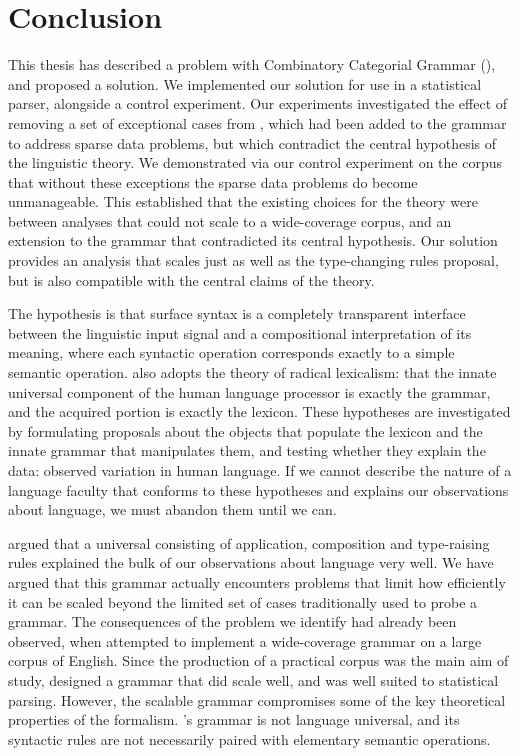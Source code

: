 \chapter{Conclusion}

This thesis has described a problem with Combinatory Categorial Grammar (\ccg),
and proposed a solution. We implemented our solution for use in a statistical
parser, alongside a control experiment. Our experiments investigated the effect
of removing a set of exceptional cases from \ccg, which had been added to the
grammar to address sparse data problems, but which contradict the central
hypothesis of the linguistic theory. We demonstrated via our control experiment
on the \nounary corpus
that without these exceptions the sparse data problems do become unmanageable.
This established that the existing choices for the \ccg theory were between
analyses that could not scale to a wide-coverage corpus, and an extension to the
grammar that contradicted its central hypothesis. Our solution provides an
analysis that scales just as well as the \citet{hock:cl07} type-changing rules
proposal, but is also compatible with the central claims of the theory.

The \ccg hypothesis is that surface syntax is a
completely transparent interface between the linguistic input signal and a
compositional interpretation of its meaning, where each syntactic operation
corresponds exactly to a simple semantic operation. \ccg also adopts the theory of
radical lexicalism: that the innate universal component of the human language
processor is exactly the grammar, and the acquired portion is exactly the
lexicon. These hypotheses are investigated by formulating proposals about the
objects that populate the lexicon and the innate grammar that manipulates them,
and testing whether they explain the data: observed variation in human
language. If we cannot describe the nature of a language faculty that conforms
to these hypotheses and explains our observations about language, we must
abandon them until we can.

\citet{baldridge:03} argued that a universal \ccg consisting of application,
composition and type-raising rules explained the bulk of our observations about
language very well. We have argued that this \ccg grammar actually encounters
problems that limit how efficiently it can be scaled beyond the limited set of
cases traditionally used to probe a grammar. The consequences of the problem we
identify had already been observed, when \citet{hock:lrec02} attempted to
implement a wide-coverage \ccg grammar on a large corpus of English. Since the
production of a practical corpus was the main aim of study,
\citet{hock:thesis03} designed a grammar that did scale well, and was well
suited to statistical parsing. However, the scalable grammar compromises some of
the key theoretical properties of the formalism. \citeauthor{hock:thesis03}'s grammar
is not language universal, and its syntactic rules are not necessarily paired with 
elementary semantic operations.

